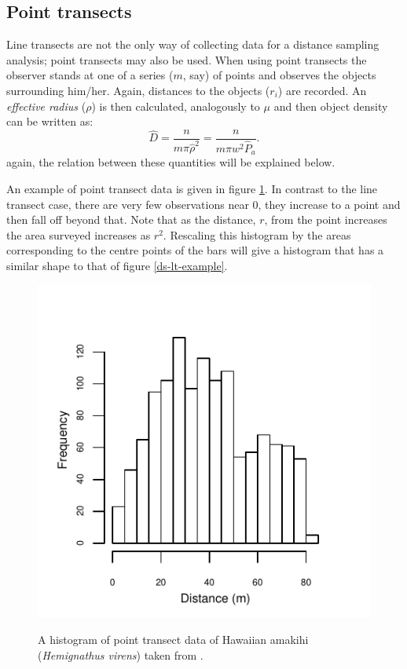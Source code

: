\subsection{Point transects}
Line transects are not the only way of collecting data for a distance sampling analysis; point transects may also be used. When using point transects the observer stands at one of a series ($m$, say) of points and observes the objects surrounding him/her. Again, distances to the objects ($r_i$) are recorded. An \textit{effective radius} ($\rho$) is then calculated, analogously to $\mu$ and then object density can be written as:
\begin{equation}
\hat{D}=\frac{n}{m \pi \hat{\rho}^2}=\frac{n}{m\pi w^2\hat{P}_a}.
\end{equation}
again, the relation between these quantities will be explained below.

An example of point transect data is given in figure \ref{ds-pt-example}. In contrast to the line transect case, there are very few observations near 0, they increase to a point and then fall off beyond that. Note that as the distance, $r$, from the point increases the area surveyed increases as $r^2$. Rescaling this histogram by the areas corresponding to the centre points of the bars will give a histogram that has a similar shape to that of figure \ref{ds-lt-example}.

\begin{figure}
\centering
\includegraphics{intro/figs/pt-data-example.pdf}\\
\caption{A histogram of point transect data of Hawaiian amakihi (\textit{Hemignathus virens}) taken from .}
\label{ds-pt-example}
\end{figure}


